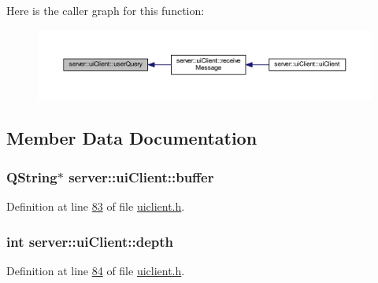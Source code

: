 Here is the caller graph for this function\-:
\nopagebreak
\begin{figure}[H]
\begin{center}
\leavevmode
\includegraphics[width=350pt]{dc/d4d/classserver_1_1ui_client_a334fdbafee59c9007c38466550572d83_icgraph}
\end{center}
\end{figure}




\subsection{Member Data Documentation}
\hypertarget{classserver_1_1ui_client_a102a1aab0f3e076a042b709d1d627f93}{
\subsubsection[{buffer}]{\setlength{\rightskip}{0pt plus 5cm}Q\-String$\ast$ server\-::ui\-Client\-::buffer\hspace{0.3cm}{\ttfamily [private]}}}\label{dc/d4d/classserver_1_1ui_client_a102a1aab0f3e076a042b709d1d627f93}


Definition at line \hyperlink{uiclient_8h_source_l00083}{83} of file \hyperlink{uiclient_8h_source}{uiclient.\-h}.

\hypertarget{classserver_1_1ui_client_a396480feb2fc63a8eac9b737d53bf7ba}{
\subsubsection[{depth}]{\setlength{\rightskip}{0pt plus 5cm}int server\-::ui\-Client\-::depth\hspace{0.3cm}{\ttfamily [private]}}}\label{dc/d4d/classserver_1_1ui_client_a396480feb2fc63a8eac9b737d53bf7ba}


Definition at line \hyperlink{uiclient_8h_source_l00084}{84} of file \hyperlink{uiclient_8h_source}{uiclient.\-h}.

